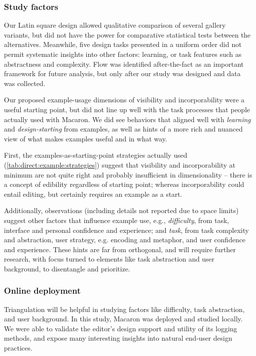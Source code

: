 \subsubsection{Study factors}
Our Latin square design allowed qualitative comparison of several gallery variants, but did not have the power for comparative statistical tests between the alternatives.
Meanwhile, five design tasks presented in a uniform order did not permit systematic insights into other factors: learning, or task features such as abstractness and complexity.
Flow was identified after-the-fact as an important framework for future analysis, but only after our study was designed and data was collected.


Our proposed example-usage dimensions of visibility and incorporability were a useful starting point, but did not line up well with the task processes that people actually used with Macaron. We did see behaviors that aligned well with \emph{learning} and \emph{design-starting} from examples, as well as hints of a more  rich and nuanced view of what makes examples useful and in what way.

First, the examples-as-starting-point strategies actually used (\autoref{tab:direct:example:strategies}) suggest that visibility and incorporability at minimum are not quite right and probably insufficient in dimensionality -- there is a concept of edibility regardless of starting point; whereas incorporability could entail editing, but certainly requires an example as a start.

Additionally, observations (including details not reported due to space limits) suggest other factors that influence example use, e.g., 
 \emph{difficulty}, from task, interface and personal confidence and experience; and
 \emph{task}, from task complexity and abstraction, user strategy, e.g. encoding and metaphor, and user confidence and experience. 
These hints are far from orthogonal, and will require further research, with focus turned to elements like task abstraction and user background, to disentangle and prioritize. 

\subsubsection{Online deployment}
Triangulation will be helpful in studying factors like difficulty, task abstraction, and user background.
In this study, Macaron was deployed and studied locally.
We were able to validate the editor's design support and utility of its logging methods, and expose many interesting insights into natural end-user design practices.

